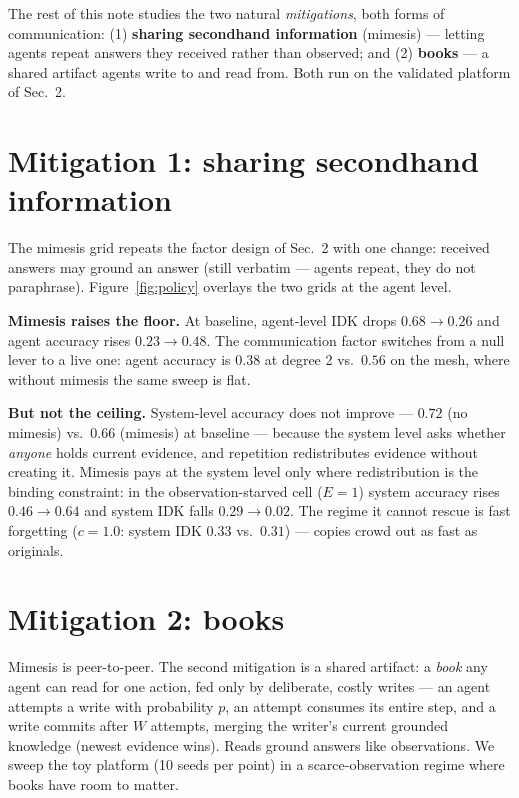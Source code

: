 \documentclass[10pt]{article}
\begin{document}
The rest of this note studies the two natural \emph{mitigations}, both forms of communication: (1) \textbf{sharing secondhand information} (mimesis) --- letting agents repeat answers they received rather than observed; and (2) \textbf{books} --- a shared artifact agents write to and read from. Both run on the validated platform of Sec.~2.

\section{Mitigation 1: sharing secondhand information}
\label{sec:mimesis}
The mimesis grid repeats the factor design of Sec.~2 with one change: received answers may ground an answer (still verbatim --- agents repeat, they do not paraphrase). Figure~\ref{fig:policy} overlays the two grids at the agent level.

\textbf{Mimesis raises the floor.} At baseline, agent-level IDK drops $0.68 \to 0.26$ and agent accuracy rises $0.23 \to 0.48$. The communication factor switches from a null lever to a live one: agent accuracy is $0.38$ at degree 2 vs.\ $0.56$ on the mesh, where without mimesis the same sweep is flat.

\textbf{But not the ceiling.} System-level accuracy does not improve --- $0.72$ (no mimesis) vs.\ $0.66$ (mimesis) at baseline --- because the system level asks whether \emph{anyone} holds current evidence, and repetition redistributes evidence without creating it. Mimesis pays at the system level only where redistribution is the binding constraint: in the observation-starved cell ($E=1$) system accuracy rises $0.46 \to 0.64$ and system IDK falls $0.29 \to 0.02$. The regime it cannot rescue is fast forgetting ($c=1.0$: system IDK $0.33$ vs.\ $0.31$) --- copies crowd out as fast as originals.


\section{Mitigation 2: books}
Mimesis is peer-to-peer. The second mitigation is a shared artifact: a \emph{book} any agent can read for one action, fed only by deliberate, costly writes --- an agent attempts a write with probability $p$, an attempt consumes its entire step, and a write commits after $W$ attempts, merging the writer's current grounded knowledge (newest evidence wins). Reads ground answers like observations. We sweep the toy platform (10 seeds per point) in a scarce-observation regime where books have room to matter.
\end{document}

